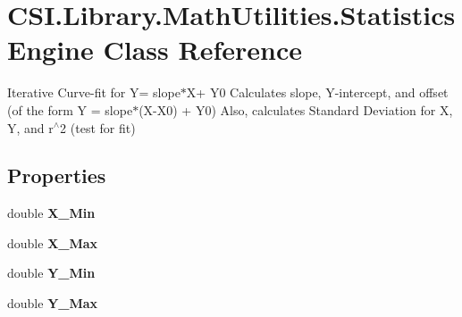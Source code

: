 \hypertarget{class_c_s_i_1_1_library_1_1_math_utilities_1_1_statistics_engine}{}\section{C\+S\+I.\+Library.\+Math\+Utilities.\+Statistics\+Engine Class Reference}
\label{class_c_s_i_1_1_library_1_1_math_utilities_1_1_statistics_engine}


Iterative Curve-\/fit for Y= slope$\ast$\+X+ Y0 Calculates slope, Y-\/intercept, and offset (of the form Y = slope$\ast$(X-\/\+X0) + Y0) Also, calculates Standard Deviation for X, Y, and r$^\wedge$2 (test for fit)  


\subsection*{Properties}
\begin{DoxyCompactItemize}
\item 
\mbox{\label{class_c_s_i_1_1_library_1_1_math_utilities_1_1_statistics_engine_ae8a1c60fedb40d44a86ba5c2e50e1262}} 
double {\bfseries X\+\_\+\+Min}
\item 
\mbox{\label{class_c_s_i_1_1_library_1_1_math_utilities_1_1_statistics_engine_a7a2f2b189d722ef15e7f3195f7f61025}} 
double {\bfseries X\+\_\+\+Max}
\item 
\mbox{\label{class_c_s_i_1_1_library_1_1_math_utilities_1_1_statistics_engine_a11b1787db4fb8c5224d460234fcc09a6}} 
double {\bfseries Y\+\_\+\+Min}
\item 
\mbox{\label{class_c_s_i_1_1_library_1_1_math_utilities_1_1_statistics_engine_aeb3122cf0e560ee8139a3f7a635ce32e}} 
double {\bfseries Y\+\_\+\+Max}
\end{DoxyCompactItemize}


